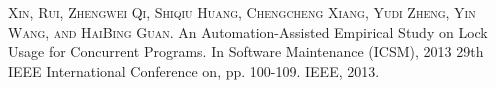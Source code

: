 
\begin{publications}{99}

    \item\textsc{Xin, Rui, Zhengwei Qi, Shiqiu Huang, Chengcheng Xiang, Yudi Zheng, Yin Wang, and HaiBing Guan}. {An Automation-Assisted Empirical Study on Lock Usage for Concurrent Programs}. In Software Maintenance (ICSM), 2013 29th IEEE International Conference on, pp. 100-109. IEEE, 2013.
\end{publications}
